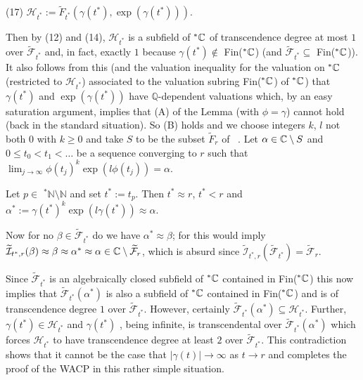 \documentclass[12pt,nodate]{article}
\begin{document}
 \vspace{2mm}
 
 \noindent
 (17) \hspace{20mm} $\mathcal{H}_{t^*} := \widetilde{F}_{t^*} (\gamma (t^* ), \exp (\gamma (t^* )))$.
 
 \vspace{2mm}
 
 Then by (12) and (14), $\mathcal{H}_{t^*}$ is a subfield of $^*\mathbb{C}$ of transcendence degree at most $1$ over $\widetilde{\mathcal{F}}_{t^*}$ and, in fact, exactly $1$ because $\gamma (t^* ) \notin$ Fin($^*\mathbb{C}$) (and $\widetilde{\mathcal{F}}_{t^*} \subseteq$ Fin($^*\mathbb{C}$)). It also follows from this (and the valuation inequality for the valuation on $^*\mathbb{C}$ (restricted to $\mathcal{H}_{t^*}$) associated to the valuation subring Fin($^*\mathbb{C}$) of $^*\mathbb{C}$) that $\gamma (t^* )$ and $\exp (\gamma (t^* ))$ have $\mathbb{Q}$-dependent valuations which, by an easy saturation argument, implies that (A) of the Lemma (with $\phi = \gamma$) cannot hold (back in the standard situation). So (B) holds and we choose integers $k$, $l$ not both $0$ with $k \geq 0$ and take $S$ to be the subset $\widetilde{F}_r$ of \C\ . Let $\alpha \in \mathbb{C} \setminus S$ and $0 \leq t_0 < t_1 < \ldots$ be a sequence converging to $r$ such that $\lim_{j \rightarrow \infty} \phi (t_j )^k \exp (l \phi (t_j )) = \alpha$.

 \vspace{1mm}
 
 Let $p \in$ $^*\mathbb{N} \setminus \mathbb{N}$ and set $t^* := t_p$.
 Then $t^* \approx r$, $t^* < r$ and $\alpha^* := \gamma (t^* )^k \exp (l\gamma (t^* )) \approx \alpha$.
 
 Now for no $\beta \in \widetilde{\mathcal{F}}_{t^*}$ do we have $\alpha^* \approx \beta$; for this would imply $\widetilde{\mathcal{I}}_{t^* , r} (\beta ) \approx \beta \approx \alpha^* \approx \alpha \in \mathbb{C} \setminus \widetilde{\mathcal{F}}_r$, which is absurd since $\widetilde{\mathcal{I}}_{t^* , r} (\widetilde{\mathcal{F}}_{t^*} ) = \widetilde{\mathcal{F}}_r$.
 
 \vspace{1mm}
 
 Since $\widetilde{\mathcal{F}}_{t^*}$ is an algebraically closed subfield of $^*\mathbb{C}$ contained in Fin($^*\mathbb{C}$) this now implies that $\widetilde{\mathcal{F}}_{t^*}(\alpha^{*})$ is also a subfield of $^*\mathbb{C}$ contained in Fin($^*\mathbb{C}$) and is of transcendence degree $1$ over 
 $\widetilde{\mathcal{F}}_{t^*}$. However, certainly $\widetilde{\mathcal{F}}_{t^*}(\alpha{^*}) \subseteq \mathcal{H}_{t^*}$. Further, $\gamma (t^* ) \in \mathcal{H}_{t^*}$ and $\gamma (t^* )$ , being 
infinite, is transcendental over 
 $\widetilde{\mathcal{F}}_{t^*}(\alpha{^*})$ which forces $\mathcal{H}_{t^*}$ to have transcendence degree at least $2$ over $\widetilde{\mathcal{F}}_{t^*}$. This contradiction shows that it cannot be the case that  $|\gamma (t)| \rightarrow \infty$ as $t \rightarrow r$ and completes the proof of the WACP in this rather simple situation. 
 
\end{document}
